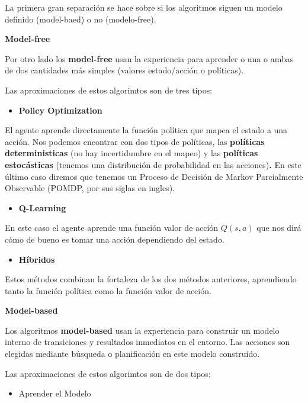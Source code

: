 \documentclass[
  a4paper,
  DIV=11,
  numbers=noendperiod]{scrreprt}
\providecommand{\tightlist}{%
  \setlength{\itemsep}{0pt}\setlength{\parskip}{0pt}}\usepackage{longtable,booktabs,array}
\begin{document}
La primera gran separación se hace sobre si los algoritmos siguen un
modelo definido (model-baed) o no (modelo-free).

\textbf{Model-free}

Por otro lado los \textbf{model-free} usan la experiencia para aprender
o una o ambas de dos cantidades más simples (valores estado/acción o
políticas).

Las aproximaciones de estos algorimtos son de tres tipos:

\begin{itemize}
\tightlist
\item
  \textbf{Policy Optimization}
\end{itemize}

El agente aprende directamente la función política que mapea el estado a
una acción. Nos podemos encontrar con dos tipos de políticas, las
\textbf{políticas deterministicas} (no hay incertidumbre en el mapeo) y
las \textbf{políticas estocásticas} (tenemos una distribución de
probabilidad en las acciones)\textbf{.} En este último caso diremos que
tenemos un Proceso de Decisión de Markov Parcialmente Observable (POMDP,
por sus siglas en ingles).

\begin{itemize}
\tightlist
\item
  \textbf{Q-Learning}
\end{itemize}

En este caso el agente aprende una función valor de acción \(Q(s,a)\)
que nos dirá cómo de bueno es tomar una acción dependiendo del estado.

\begin{itemize}
\tightlist
\item
  \textbf{Híbridos}
\end{itemize}

Estos métodos combinan la fortaleza de los dos métodos anteriores,
aprendiendo tanto la función política como la función valor de acción.

\textbf{Model-based}

Los algoritmos \textbf{model-based} usan la experiencia para construir
un modelo interno de transiciones y resultados inmediatos en el entorno.
Las acciones son elegidas mediante búsqueda o planificación en este
modelo construido.

Las aproximaciones de estos algorimtos son de dos tipos:

\begin{itemize}
\tightlist
\item
  Aprender el Modelo
\end{itemize}
\end{document}
